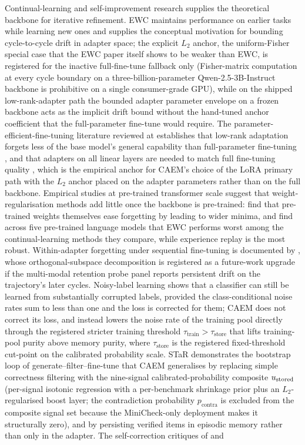 Continual-learning and self-improvement research supplies the theoretical backbone for iterative refinement. EWC \cite{doi:10.1073/pnas.1611835114} maintains performance on earlier tasks while learning new ones and supplies the conceptual motivation for bounding cycle-to-cycle drift in adapter space; the explicit $L_{2}$ anchor, the uniform-Fisher special case that the EWC paper itself shows to be weaker than EWC, is registered for the inactive full-fine-tune fallback only (Fisher-matrix computation at every cycle boundary on a three-billion-parameter Qwen-2.5-3B-Instruct backbone is prohibitive on a single consumer-grade GPU), while on the shipped low-rank-adapter path the bounded adapter parameter envelope on a frozen backbone acts as the implicit drift bound without the hand-tuned anchor coefficient that the full-parameter fine-tune would require. The parameter-efficient-fine-tuning literature reviewed at  establishes that low-rank adaptation \cite{hu2022lora} forgets less of the base model's general capability than full-parameter fine-tuning \cite{biderman2024lora}, and that adapters on all linear layers are needed to match full fine-tuning quality \cite{dettmers2023qlora}, which is the empirical anchor for CAEM's choice of the LoRA primary path with the $L_2$ anchor placed on the adapter parameters rather than on the full backbone. Empirical studies at pre-trained transformer scale suggest that weight-regularisation methods add little once the backbone is pre-trained: \cite{mehta2023empirical} find that pre-trained weights themselves ease forgetting by leading to wider minima, and \cite{wu2022pretrained} find across five pre-trained language models that EWC performs worst among the continual-learning methods they compare, while experience replay is the most robust. Within-adapter forgetting under sequential fine-tuning is documented by \cite{wang2023olora}, whose orthogonal-subspace decomposition is registered as a future-work upgrade if the multi-modal retention probe panel reports persistent drift on the trajectory's later cycles. Noisy-label learning \cite{natarajan2013learning} shows that a classifier can still be learned from substantially corrupted labels, provided the class-conditional noise rates sum to less than one and the loss is corrected for them; CAEM does not correct its loss, and instead lowers the noise rate of the training pool directly through the registered stricter training threshold $\tau_{\text{train}} > \tau_{\text{store}}$ that lifts training-pool purity above memory purity, where $\tau_{\text{store}}$ is the registered fixed-threshold cut-point on the calibrated probability scale. STaR \cite{NEURIPS2022_639a9a17} demonstrates the bootstrap loop of generate--filter--fine-tune that CAEM generalises by replacing simple correctness filtering with the nine-signal calibrated-probability composite $u_{\text{stored}}$ (per-signal isotonic regression with a per-benchmark shrinkage prior plus an $L_{2}$-regularised boost layer; the contradiction probability $p_{\text{contra}}$ is excluded from the composite signal set because the MiniCheck-only deployment makes it structurally zero), and by persisting verified items in episodic memory rather than only in the adapter. The self-correction critiques of \cite{huang2024cannot} and 